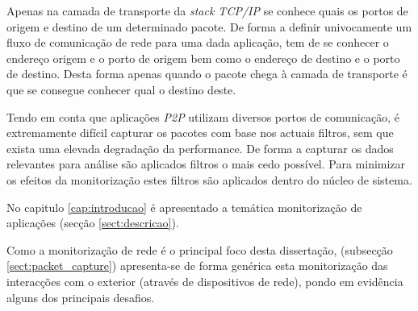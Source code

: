 Apenas na camada de transporte da \textit{stack TCP/IP} se conhece quais os portos de origem e destino de um determinado pacote.
De forma a definir univocamente um fluxo de comunicação de rede para uma dada aplicação, tem de se conhecer o endereço origem e o porto de origem bem como o endereço de destino e o porto de destino.
Desta forma apenas quando o pacote chega à camada de transporte é que se consegue conhecer qual o destino deste.

Tendo em conta que aplicações \textit{P2P} utilizam diversos portos de comunicação, é extremamente difícil capturar os pacotes com base nos actuais filtros, sem que exista uma elevada degradação da performance.
De forma a capturar os dados relevantes para análise são aplicados filtros o mais cedo possível. Para minimizar os efeitos da monitorização estes filtros são aplicados dentro do núcleo de sistema.


% 
\bigskip 

No capitulo \ref{cap:introducao} é apresentado a temática monitorização de aplicações (secção \ref{sect:descricao}).

Como a monitorização de rede é o principal foco desta dissertação, (subsecção \ref{sect:packet_capture}) apresenta-se de forma genérica esta monitorização das interacções com o exterior (através de dispositivos de rede), pondo em evidência alguns dos principais desafios.

